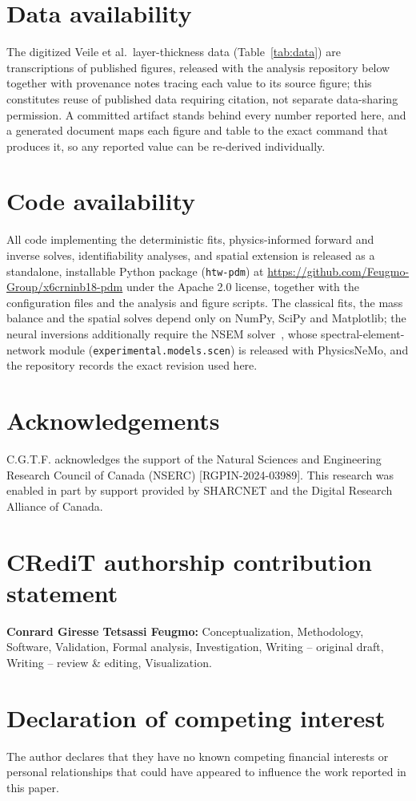 \documentclass[a4paper,fleqn]{cas-sc}
\begin{document}
\section*{Data availability}

The digitized Veile et al.\ layer-thickness data
(Table~\ref{tab:data}) are transcriptions of published figures,
released with the analysis repository below together with provenance
notes tracing each value to its source figure; this constitutes reuse of
published data requiring citation, not separate data-sharing permission.
A committed artifact stands behind every number reported here, and a
generated document maps each figure and table to the exact command that
produces it, so any reported value can be re-derived individually.

\section*{Code availability}

All code implementing the deterministic fits, physics-informed forward
and inverse solves, identifiability analyses, and spatial extension is
released as a standalone, installable Python package
(\texttt{htw-pdm}) at
\url{https://github.com/Feugmo-Group/x6crninb18-pdm} under the Apache
2.0 license, together with the configuration files and the analysis and
figure scripts. The classical fits, the mass balance and the spatial
solves depend only on NumPy, SciPy and Matplotlib; the neural inversions
additionally require the NSEM solver~\citep{feugmo2026nsem}, whose
spectral-element-network module
(\texttt{experimental.\allowbreak models.\allowbreak scen}) is
released with PhysicsNeMo, and the repository records the exact revision
used here.

\section*{Acknowledgements}

C.G.T.F. acknowledges the support of the Natural Sciences and
Engineering Research Council of Canada (NSERC)
[RGPIN-2024-03989]. This research was enabled in part by support
provided by SHARCNET and the Digital Research Alliance of Canada.

\section*{CRediT authorship contribution statement}

\textbf{Conrard Giresse Tetsassi Feugmo:} Conceptualization,
Methodology, Software, Validation, Formal analysis, Investigation,
Writing -- original draft, Writing -- review \& editing, Visualization.

\section*{Declaration of competing interest}

The author declares that they have no known competing financial interests
or personal relationships that could have appeared to influence the work
reported in this paper.



\end{document}
